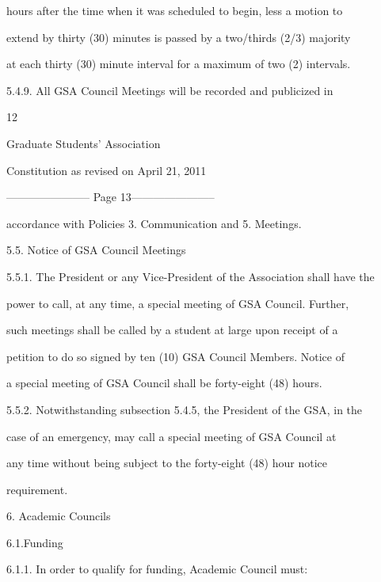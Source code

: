 \documentclass{article}
\begin{document}
hours after the time when it was scheduled to begin, less a motion to  

extend by thirty (30) minutes is passed by a two/thirds (2/3) majority  

at each thirty (30) minute interval for a maximum of two (2) intervals.  



5.4.9. All   GSA   Council   Meetings   will   be   recorded   and   publicized   in  



 

      12  



Graduate Students’ Association  



   Constitution as revised on April 21, 2011  


----------------------- Page 13-----------------------

accordance with Policies 3. Communication and 5. Meetings.  



5.5. Notice of GSA Council Meetings  



5.5.1. The President or any Vice-President of the Association shall have the  

power to call, at any time, a special meeting of GSA Council. Further,  

such meetings shall be called by a student at large upon receipt of a  

petition to do so signed by ten (10) GSA Council Members. Notice of  

a special meeting of GSA Council shall be forty-eight (48) hours.  



5.5.2. Notwithstanding  subsection  5.4.5,  the  President  of  the  GSA,  in  the  

case of an emergency, may call a special meeting of GSA Council at  

any  time  without  being  subject  to  the  forty-eight  (48)  hour  notice  

requirement.  



6.  Academic Councils  



6.1.Funding  



6.1.1. In order to qualify for funding, Academic Council must:  
\end{document}
